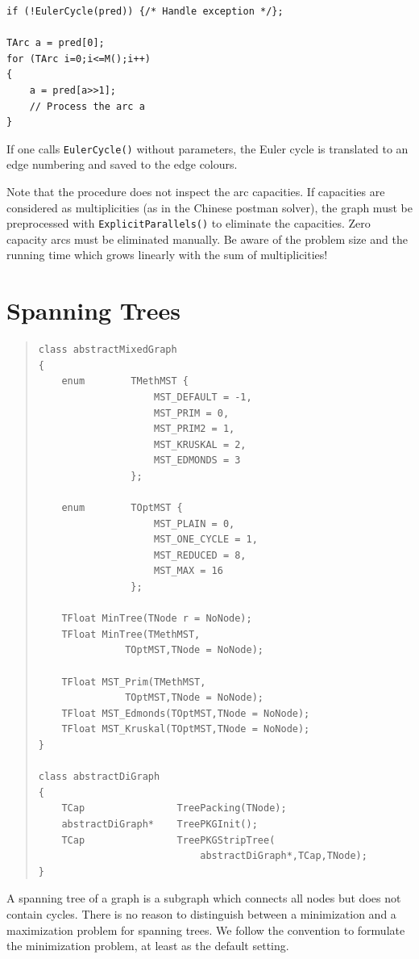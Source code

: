 \documentclass[a4paper,11pt,twoside]{book}
\begin{document}
\begin{multicols}{2}
\begin{mysample}
\begin{verbatim}
if (!EulerCycle(pred)) {/* Handle exception */};

TArc a = pred[0];
for (TArc i=0;i<=M();i++)
{
    a = pred[a>>1];
    // Process the arc a
}
\end{verbatim}
\end{mysample}
If one calls \verb/EulerCycle()/ without parameters, the Euler cycle is translated
to an edge numbering and saved to the edge colours.

Note that the procedure does not inspect the arc capacities. If capacities are
considered as multiplicities (as in the Chinese postman solver), the graph must
be preprocessed with \verb/ExplicitParallels()/ to eliminate the capacities.
Zero capacity arcs must be eliminated manually. Be aware of the problem size and
the running time which grows linearly with the sum of multiplicities!



\vfill
{}
\section{Spanning Trees}
\label{slb_solve_mintree}
\methods
\begin{quote}
\begin{verbatim}
class abstractMixedGraph
{
    enum        TMethMST {
                    MST_DEFAULT = -1,
                    MST_PRIM = 0,
                    MST_PRIM2 = 1,
                    MST_KRUSKAL = 2,
                    MST_EDMONDS = 3
                };

    enum        TOptMST {
                    MST_PLAIN = 0,
                    MST_ONE_CYCLE = 1,
                    MST_REDUCED = 8,
                    MST_MAX = 16
                };

    TFloat MinTree(TNode r = NoNode);
    TFloat MinTree(TMethMST,
               TOptMST,TNode = NoNode);

    TFloat MST_Prim(TMethMST,
               TOptMST,TNode = NoNode);
    TFloat MST_Edmonds(TOptMST,TNode = NoNode);
    TFloat MST_Kruskal(TOptMST,TNode = NoNode);
}

class abstractDiGraph
{
    TCap                TreePacking(TNode);
    abstractDiGraph*    TreePKGInit();
    TCap                TreePKGStripTree(
                            abstractDiGraph*,TCap,TNode);
}
\end{verbatim}
\end{quote}
A spanning tree of a graph is a subgraph which connects all nodes but does
not contain cycles. There is no reason to distinguish between a minimization
and a maximization problem for spanning trees. We follow the convention to
formulate the minimization problem, at least as the default setting.


\end{multicols}
\end{document}
